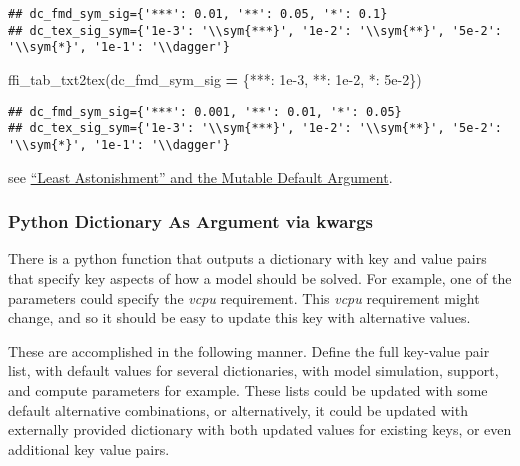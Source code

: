 \documentclass[
]{book}
\newenvironment{Shaded}{\begin{snugshade}}{\end{snugshade}}
\newcommand{\FloatTok}[1]{\textcolor[rgb]{0.00,0.00,0.81}{#1}}
\newcommand{\NormalTok}[1]{#1}
\newcommand{\OperatorTok}[1]{\textcolor[rgb]{0.81,0.36,0.00}{\textbf{#1}}}
\newcommand{\StringTok}[1]{\textcolor[rgb]{0.31,0.60,0.02}{#1}}
\begin{document}
\begin{verbatim}
## dc_fmd_sym_sig={'***': 0.01, '**': 0.05, '*': 0.1}
## dc_tex_sig_sym={'1e-3': '\\sym{***}', '1e-2': '\\sym{**}', '5e-2': '\\sym{*}', '1e-1': '\\dagger'}
\end{verbatim}

\begin{Shaded}
\begin{Highlighting}[]
\NormalTok{ffi\_tab\_txt2tex(dc\_fmd\_sym\_sig }\OperatorTok{=}\NormalTok{ \{}\StringTok{\textquotesingle{}***\textquotesingle{}}\NormalTok{: }\FloatTok{1e{-}3}\NormalTok{, }\StringTok{\textquotesingle{}**\textquotesingle{}}\NormalTok{: }\FloatTok{1e{-}2}\NormalTok{, }\StringTok{\textquotesingle{}*\textquotesingle{}}\NormalTok{: }\FloatTok{5e{-}2}\NormalTok{\})}
\end{Highlighting}
\end{Shaded}

\begin{verbatim}
## dc_fmd_sym_sig={'***': 0.001, '**': 0.01, '*': 0.05}
## dc_tex_sig_sym={'1e-3': '\\sym{***}', '1e-2': '\\sym{**}', '5e-2': '\\sym{*}', '1e-1': '\\dagger'}
\end{verbatim}

see \href{https://stackoverflow.com/questions/1132941/least-astonishment-and-the-mutable-default-argument}{``Least Astonishment'' and the Mutable Default Argument}.

\hypertarget{python-dictionary-as-argument-via-kwargs}{%
\subsubsection{Python Dictionary As Argument via kwargs}\label{python-dictionary-as-argument-via-kwargs}}

There is a python function that outputs a dictionary with key and value pairs that specify key aspects of how a model should be solved. For example, one of the parameters could specify the \emph{vcpu} requirement. This \emph{vcpu} requirement might change, and so it should be easy to update this key with alternative values.

These are accomplished in the following manner. Define the full key-value pair list, with default values for several dictionaries, with model simulation, support, and compute parameters for example. These lists could be updated with some default alternative combinations, or alternatively, it could be updated with externally provided dictionary with both updated values for existing keys, or even additional key value pairs.
\end{document}
